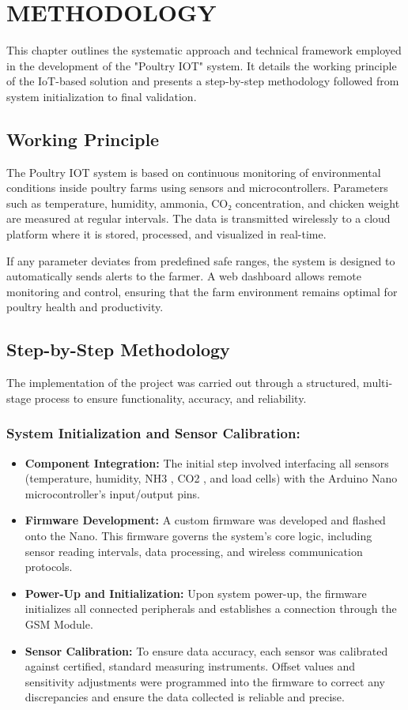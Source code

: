 \documentclass[../main.tex]{subfiles}
\begin{document}
\section{METHODOLOGY}
This chapter outlines the systematic approach and technical framework employed in the 
development of the "Poultry IOT" system. It details the working principle of the IoT-based 
solution and presents a step-by-step methodology followed from system initialization to final validation.
\subsection{Working Principle}
The Poultry IOT system is based on continuous monitoring of environmental conditions inside poultry farms using sensors and microcontrollers. Parameters such as temperature, humidity, ammonia, CO₂ concentration, and chicken weight are measured at regular intervals. The data is transmitted wirelessly to a cloud platform where it is stored, processed, and visualized in real-time.

If any parameter deviates from predefined safe ranges, the system is designed to automatically sends alerts to the farmer. A web dashboard allows remote monitoring and control, ensuring that the farm environment remains optimal for poultry health and productivity.

\subsection{Step-by-Step Methodology}
The implementation of the project was carried out through a structured, multi-stage process to ensure functionality, accuracy, and reliability.
\subsubsection{System Initialization and Sensor Calibration:}
\begin{itemize}
\item \textbf{Component Integration:} The initial step involved interfacing all sensors (temperature, humidity, NH3 , CO2 , and load cells) with the Arduino Nano microcontroller's input/output pins.
\item \textbf{Firmware Development:} A custom firmware was developed and flashed onto the Nano. This firmware governs the system's core logic, including sensor reading 
intervals, data processing, and wireless communication protocols. 
\item \textbf{Power-Up and Initialization:} Upon system power-up, the firmware initializes all connected peripherals and establishes a connection through the GSM Module. 
\item \textbf{ Sensor Calibration:} To ensure data accuracy, each sensor was calibrated against certified, standard measuring instruments. Offset values and sensitivity adjustments were programmed into the firmware to correct any discrepancies and ensure the data collected is reliable and precise.
\end{itemize}
\end{document}
